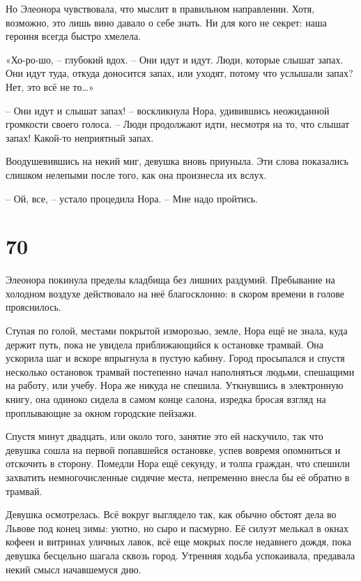 \documentclass[
  a5paperpaper,
  DIV=11,
  numbers=noendperiod]{scrreprt}
\begin{document}
Но Элеонора чувствовала, что мыслит в правильном направлении. Хотя,
возможно, это лишь вино давало о себе знать. Ни для кого не секрет: наша
героиня всегда быстро хмелела.

«Хо-ро-шо, -- глубокий вдох. -- Они идут и идут. Люди, которые слышат
запах. Они идут туда, откуда доносится запах, или уходят, потому что
услышали запах? Нет, это всё не то\ldots»

-- Они идут и слышат запах! -- воскликнула Нора, удивившись неожиданной
громкости своего голоса. -- Люди продолжают идти, несмотря на то, что
слышат запах! Какой-то неприятный запах.

Воодушевившись на некий миг, девушка вновь приуныла. Эти слова
показались слишком нелепыми после того, как она произнесла их вслух.

-- Ой, все, -- устало процедила Нора. -- Мне надо пройтись.

\section*{70}\label{70}


Элеонора покинула пределы кладбища без лишних раздумий. Пребывание на
холодном воздухе действовало на неё благосклонно: в скором времени в
голове прояснилось.

Ступая по голой, местами покрытой изморозью, земле, Нора ещё не знала,
куда держит путь, пока не увидела приближающийся к остановке трамвай.
Она ускорила шаг и вскоре впрыгнула в пустую кабину. Город просыпался и
спустя несколько остановок трамвай постепенно начал наполняться людьми,
спешащими на работу, или учебу. Нора же никуда не спешила. Уткнувшись в
электронную книгу, она одиноко сидела в самом конце салона, изредка
бросая взгляд на проплывающие за окном городские пейзажи.

Спустя минут двадцать, или около того, занятие это ей наскучило, так что
девушка сошла на первой попавшейся остановке, успев вовремя опомниться и
отскочить в сторону. Помедли Нора ещё секунду, и толпа граждан, что
спешили захватить немногочисленные сидячие места, непременно внесла бы
её обратно в трамвай.

Девушка осмотрелась. Всё вокруг выглядело так, как обычно обстоят дела
во Львове под конец зимы: уютно, но сыро и пасмурно. Её силуэт мелькал в
окнах кофеен и витринах уличных лавок, всё еще мокрых после недавнего
дождя, пока девушка бесцельно шагала сквозь город. Утренняя ходьба
успокаивала, предавала некий смысл начавшемуся дню.
\end{document}
